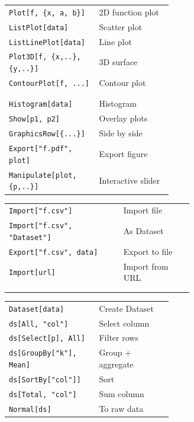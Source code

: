 \documentclass[10pt]{extarticle}
\begin{document}
\begin{multicols}{2}
\begin{tabularx}{\linewidth}{@{}>{\raggedright\arraybackslash}p{0.55\linewidth}@{\enspace}Y@{}}
\texttt{Plot[f, \{x, a, b\}]}      & 2D function plot \\
\texttt{ListPlot[data]}             & Scatter plot \\
\texttt{ListLinePlot[data]}         & Line plot \\
\texttt{Plot3D[f, \{x,..\}, \{y,..\}]}  & 3D surface \\
\texttt{ContourPlot[f, ...]}        & Contour plot \\
 & \\
 \\
\texttt{Histogram[data]}            & Histogram \\
\texttt{Show[p1, p2]}               & Overlay plots \\
\texttt{GraphicsRow[\{...\}]}      & Side by side \\
\texttt{Export["f.pdf", plot]}      & Export figure \\
\texttt{Manipulate[plot, \{p,..\}]} & Interactive slider \\
\end{tabularx}

\begin{tabularx}{\linewidth}{@{}>{\raggedright\arraybackslash}p{0.62\linewidth}@{\enspace}Y@{}}
\texttt{Import["f.csv"]}            & Import file \\
\texttt{Import["f.csv", "Dataset"]} & As Dataset \\
\texttt{Export["f.csv", data]}      & Export to file \\
\texttt{Import[url]}                & Import from URL \\
 & \\
 \\
\end{tabularx}

\begin{tabularx}{\linewidth}{@{}>{\raggedright\arraybackslash}p{0.55\linewidth}@{\enspace}Y@{}}
\texttt{Dataset[data]}              & Create Dataset \\
\texttt{ds[All, "col"]}             & Select column \\
\texttt{ds[Select[p], All]}        & Filter rows \\
\texttt{ds[GroupBy["k"], Mean]}    & Group + aggregate \\
\texttt{ds[SortBy["col"]]}         & Sort \\
\texttt{ds[Total, "col"]}          & Sum column \\
\texttt{Normal[ds]}                 & To raw data \\
\end{tabularx}


\end{multicols}
\end{document}
